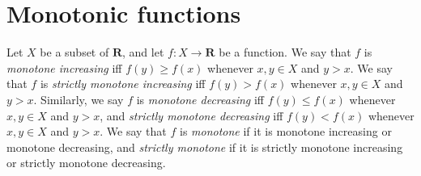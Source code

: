 \section{Monotonic functions}\label{sec 9.8}

\begin{definition}\label{9.8.1}
    Let \(X\) be a subset of \(\mathbf{R}\), and let \(f : X \to \mathbf{R}\) be a function.
    We say that \(f\) is \emph{monotone increasing} iff \(f(y) \geq f(x)\) whenever \(x, y \in X\) and \(y > x\).
    We say that \(f\) is \emph{strictly monotone increasing} iff \(f(y) > f(x)\) whenever \(x, y \in X\) and \(y > x\).
    Similarly, we say \(f\) is \emph{monotone decreasing} iff \(f(y) \leq f(x)\) whenever \(x, y \in X\) and \(y > x\), and \emph{strictly monotone decreasing} iff \(f(y) < f(x)\) whenever \(x, y \in X\) and \(y > x\).
    We say that \(f\) is \emph{monotone} if it is monotone increasing or monotone decreasing, and \emph{strictly monotone} if it is strictly monotone increasing or strictly monotone decreasing.
\end{definition}